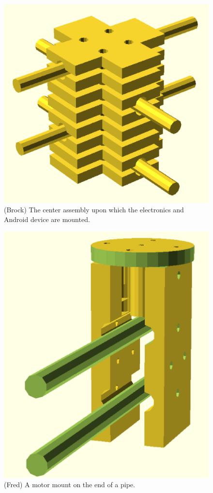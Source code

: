 \documentclass[letterpaper]{article}
\begin{document}
\begin{figure}[htb]
  \centering
  \includegraphics[scale=0.4]{figures/brock_assembly.eps}
  \caption{(Brock) The center assembly upon which the electronics and
    Android device are mounted.}
  \label{fig:brock}
\end{figure}

\begin{figure}[htb]
  \centering
  \includegraphics[scale=0.4]{figures/fred.eps}
  \caption{(Fred) A motor mount on the end of a pipe.}
  \label{fig:fred}
\end{figure}
\end{document}
